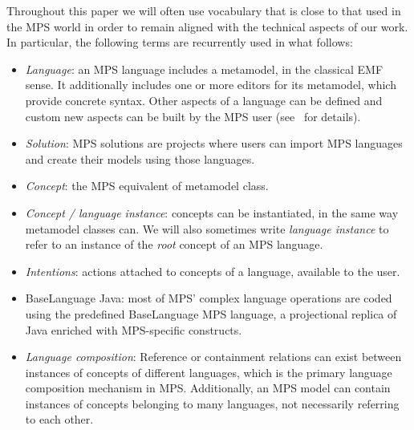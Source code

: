 Throughout this paper we will often use vocabulary that is close to that used in
the MPS world in order to remain aligned with the technical aspects of our
work. In particular, the following terms are recurrently used in what follows:
\vspace{-.1cm}
\begin{itemize}
  \item \emph{Language}: an MPS language includes a metamodel, in the classical
  EMF sense. It additionally includes one or more editors for its metamodel,
  which provide concrete syntax. Other aspects of a language
  can be defined and custom new aspects can be
  built by the MPS user (see~\cite{mps} for details).
  \item \emph{Solution}: MPS solutions are projects where users can import
  MPS languages and create their models using those languages.
  \item \emph{Concept}: the MPS equivalent of metamodel class.
  \item \emph{Concept / language instance}: concepts can be instantiated, in
  the same way metamodel classes can. We will also sometimes write
  \emph{language instance} to refer to an instance of the \emph{root} concept of
  an MPS language.
  \item \emph{Intentions}: actions attached to
  concepts of a language, available to the user. 
  \item \textsf{BaseLanguage Java}: most of MPS' complex language operations are
  coded using the predefined \textsf{BaseLanguage} MPS language, a projectional
  replica of Java enriched with MPS-specific constructs.
  \item \emph{Language composition}:  Reference or containment relations can exist between instances of
  concepts of different languages, which is the primary language composition
  mechanism in MPS.
  Additionally, an MPS model can contain instances of concepts
 belonging to many languages, not necessarily referring to each other.
\end{itemize}
\vspace{-.5cm}
